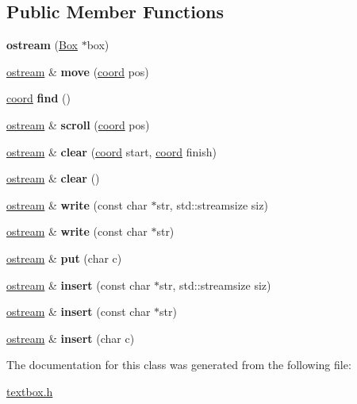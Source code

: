 \subsection*{Public Member Functions}
\begin{DoxyCompactItemize}
\item 
\mbox{\label{a00024_a7731093fa8055859dbd787daccf05487}} 
{\bfseries ostream} (\hyperlink{a00032}{Box} $\ast$box)
\item 
\mbox{\label{a00024_a5d54f321f1c93a532187cecd7066abfb}} 
\hyperlink{a00024}{ostream} \& {\bfseries move} (\hyperlink{a00016}{coord} pos)
\item 
\mbox{\label{a00024_a668803d866c61762e43afaebbaab7e23}} 
\hyperlink{a00016}{coord} {\bfseries find} ()
\item 
\mbox{\label{a00024_a2c464c6349d5251b3af55a60175a66ad}} 
\hyperlink{a00024}{ostream} \& {\bfseries scroll} (\hyperlink{a00016}{coord} pos)
\item 
\mbox{\label{a00024_a57afd191cfe61c5a5520cfbf3c67c442}} 
\hyperlink{a00024}{ostream} \& {\bfseries clear} (\hyperlink{a00016}{coord} start, \hyperlink{a00016}{coord} finish)
\item 
\mbox{\label{a00024_aa8c666d1e8cca923e3dbe8d97618dbc3}} 
\hyperlink{a00024}{ostream} \& {\bfseries clear} ()
\item 
\mbox{\label{a00024_a322785bda06f0ec90877de7c06f8b2b4}} 
\hyperlink{a00024}{ostream} \& {\bfseries write} (const char $\ast$str, std\+::streamsize siz)
\item 
\mbox{\label{a00024_a2c35e6b1045c1b49167d64b301375774}} 
\hyperlink{a00024}{ostream} \& {\bfseries write} (const char $\ast$str)
\item 
\mbox{\label{a00024_a559bcf10a372c9b21752150db3f4636d}} 
\hyperlink{a00024}{ostream} \& {\bfseries put} (char c)
\item 
\mbox{\label{a00024_a3bf0d2b4a90765422fbdf7d05dd4a3d4}} 
\hyperlink{a00024}{ostream} \& {\bfseries insert} (const char $\ast$str, std\+::streamsize siz)
\item 
\mbox{\label{a00024_a0501fcaeaa1306aa12de21f9ca056270}} 
\hyperlink{a00024}{ostream} \& {\bfseries insert} (const char $\ast$str)
\item 
\mbox{\label{a00024_a98957e4cc91144fbbc169322fe7dddfa}} 
\hyperlink{a00024}{ostream} \& {\bfseries insert} (char c)
\end{DoxyCompactItemize}


The documentation for this class was generated from the following file\+:\begin{DoxyCompactItemize}
\item 
\hyperlink{a00005}{textbox.\+h}\end{DoxyCompactItemize}
